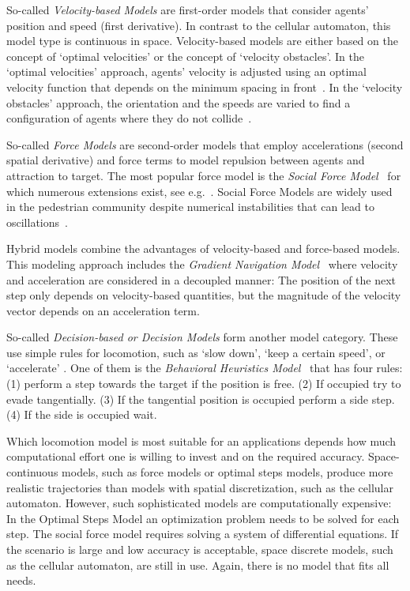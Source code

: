 %
So-called \textit{Velocity-based Models} are first-order models that consider agents' position and speed (first derivative). In contrast to the cellular automaton, this model type is continuous in space.
Velocity-based models are either based on the concept of `optimal velocities' or the concept of `velocity obstacles'. In the `optimal velocities' approach, agents' velocity is adjusted using an optimal velocity function that depends on the minimum spacing in front~\cite{tordeux-2014-cdyn}. In the `velocity obstacles' approach, the orientation and the speeds are varied to find a configuration of agents where they do not collide~\cite{karamouzas-2009-cdyn}. 

So-called \textit{Force Models} are second-order models that employ accelerations (second spatial derivative) and force terms to model repulsion between agents and attraction to target. The most popular force model is the \textit{Social Force Model}~\cite{hirai-1975-cdyn,helbing-1995-cdyn} for which numerous extensions exist, see e.g.~\cite{chen-2018-cdyn}. Social Force Models are widely used in the pedestrian community despite numerical instabilities that can lead to oscillations~\cite{koster-2013-cdyn}.

Hybrid models combine the advantages of velocity-based and force-based models. This modeling approach includes the \textit{Gradient Navigation Model}~\cite{dietrich-2014-cdyn} where velocity and acceleration are considered in a decoupled manner: The position of the next step only depends on velocity-based quantities, but the magnitude of the velocity vector depends on an acceleration term.

So-called \textit{Decision-based or Decision Models} form another model category. These use simple rules for locomotion, such as `slow down', `keep a certain speed', or `accelerate' \cite{antonini-2006-cdyn}. One of them is the \textit{Behavioral Heuristics Model}~\cite{seitz-2016c-cdyn} that has four rules: (1) perform a step towards the target if the position is free. (2) If occupied try to evade tangentially. (3) If the tangential position is occupied perform a side step. (4) If the side is occupied wait.



Which locomotion model is most suitable for an applications depends how much computational effort one is willing to invest and on the required accuracy. Space-continuous models, such as force models or optimal steps models, produce more realistic trajectories than models with spatial discretization, such as the cellular automaton. However, such sophisticated models are computationally expensive: In the Optimal Steps Model an optimization problem needs to be solved for each step. The social force model requires solving a system of differential equations. If the scenario is large and low accuracy is acceptable, space discrete models, such as the cellular automaton, are still in use. Again, there is no model that fits all needs.












